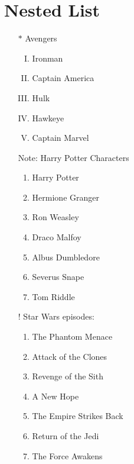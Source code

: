 \documentclass[a4paper,15pt]{article}
\begin{document}
	\section{Nested List}
	\begin{itemize}
		\item[$*$] Avengers
		\begin{enumerate}[(I)]
			\item Ironman
			\item Captain America
			\item Hulk
			\item Hawkeye
			\item Captain Marvel
		\end{enumerate}
		\item[Note:] Harry Potter Characters
		\begin{enumerate}
			\item Harry Potter
			\item Hermione Granger
			\item Ron Weasley
			\item Draco Malfoy
			\item Albus Dumbledore
			\item Severus Snape
			\item Tom Riddle
		\end{enumerate}
		\item[!] Star Wars episodes:
		\begin{enumerate}[I:]
			\item The Phantom Menace
			\item Attack of the Clones
			\item Revenge of the Sith
			\item A New Hope
			\item The Empire Strikes Back
			\item Return of the Jedi
			\item The Force Awakens
		\end{enumerate}
	\end{itemize}
	\newpage
\end{document}
